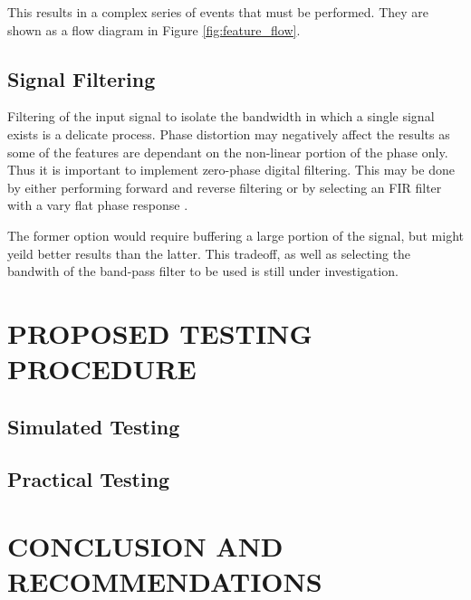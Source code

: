 \documentclass[10pt,twocolumn]{witseiepaper}
\begin{document}
			This results in a complex series of events that must be performed. They are shown as a flow diagram in Figure \ref{fig:feature_flow}.

		\subsection{Signal Filtering}
			Filtering of the input signal to isolate the bandwidth in which a single signal exists is a delicate process. 
			Phase distortion may negatively affect the results as some of the features are dependant on the non-linear portion of the phase only. 
			Thus it is important to implement zero-phase digital filtering.
			This may be done by either performing forward and reverse filtering or by selecting an FIR filter with a vary flat phase response \cite{something?}.

			The former option would require buffering a large portion of the signal, but might yeild better results than the latter. This tradeoff, as well as selecting the bandwith of the band-pass filter to be used is still under investigation.


\section{PROPOSED TESTING PROCEDURE}
	\subsection{Simulated Testing}
	\subsection{Practical Testing}

\section{CONCLUSION AND RECOMMENDATIONS}



 
\end{document}

